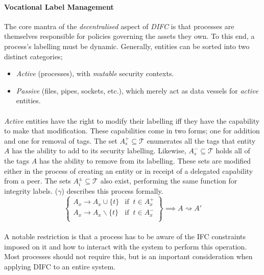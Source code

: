 \paragraph{Vocational Label Management} The core mantra of the \textit{decentralised} aspect of \textit{DIFC} is that processes are themselves responsible for policies governing the assets they own. To this end, a process's labelling must be dynamic. Generally, entities can be sorted into two distinct categories;

\begin{itemize}
    \item \textit{Active} (processes), with \textit{mutable} security contexts.
    \item \textit{Passive} (files, pipes, sockets, etc.), which merely act as data vessels for \textit{active} entities.
\end{itemize}

\paragraph{} \textit{Active} entities have the right to modify their labelling iff they have the capability to make that modification. These capabilities come in two forms; one for addition and one for removal of tags. The set $A_{s}^{+} \subseteq \mathcal{T}$ enumerates all the tags that entity $A$ has the ability to add to its security labelling. Likewise, $A_{s}^{-} \subseteq \mathcal{T}$ holds all of the tags $A$ has the ability to remove from its labelling. These sets are modified either in the process of creating an entity or in receipt of a delegated capability from a peer. The sets $A_{i}^{\pm} \subseteq \mathcal{T}$ also exist, performing the same function for integrity labels. ($\gamma$) describes this process formally.
\begin{equation}
    \left\{\begin{array}{lr}
        A_x \rightarrow A_x \cup \{t\} & \text{if} \;\; t \in A_{x}^{+} \\
        A_x \rightarrow A_x \smallsetminus \{t\} & \text{if} \;\; t \in A_{x}^{-} \\
    \end{array}\right\} \implies A \rightsquigarrow A' \tag{$\gamma$}
\end{equation}

\paragraph{} A notable restriction is that a process has to be aware of the IFC constraints imposed on it and how to interact with the system to perform this operation. Most processes should not require this, but is an important consideration when applying DIFC to an entire system.

